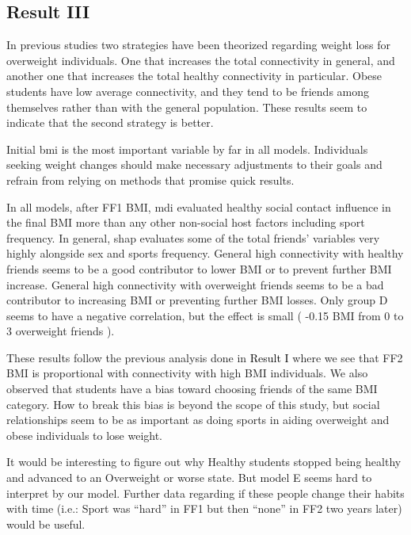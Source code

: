 \subsection{Result III}


In previous studies \cite{ElSayed2013, Zhang2015} two strategies have been theorized regarding weight loss for overweight individuals. One that increases the total connectivity in general, and another one that increases the total healthy connectivity in particular. Obese students have low average connectivity, and they tend to be friends among themselves rather than with the general population. These results seem to indicate that the second strategy is better. 


Initial \gls{bmi} is the most important variable by far in all models. Individuals seeking weight changes should make necessary adjustments to their goals and refrain from relying on methods that promise quick results.

In all models, after FF1 BMI, \gls{mdi} evaluated healthy social contact influence in the final BMI more than any other non-social host factors including sport frequency. In general, \gls{shap} evaluates some of the total friends' variables very highly alongside sex and sports frequency. General high connectivity with healthy friends seems to be a good contributor to lower BMI or to prevent further BMI increase. General high connectivity with overweight friends seems to be a bad contributor to increasing BMI or preventing further BMI losses. Only group D seems to have a negative correlation, but the effect is small ( -0.15 BMI from 0 to 3 overweight friends ).


These results follow the previous analysis done in \colorbox{ResultColor}{\textcolor{black}{Result I}} where we see that FF2 BMI is proportional with connectivity with high BMI individuals. We also observed that students have a bias toward choosing friends of the same BMI category. How to break this bias is beyond the scope of this study, but social relationships seem to be as important as doing sports in aiding overweight and obese individuals to lose weight. 


It would be interesting to figure out why Healthy students stopped being healthy and advanced to an Overweight or worse state. But model E seems hard to interpret by our model. Further data regarding if these people change their habits with time (i.e.: Sport was “hard” in FF1 but then “none” in FF2 two years later) would be useful. 

